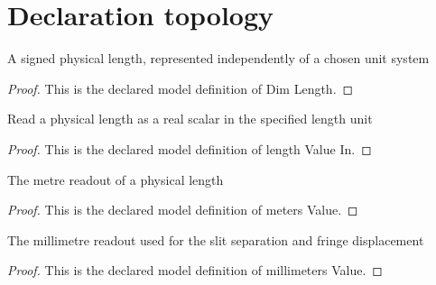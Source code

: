 \section{Declaration topology}
\begin{definition}
  \label{def:physics:phyx-mini-0046:phyxminiproblems-problemphyxmini0046-dimlength}
  A signed physical length, represented independently of a chosen unit system
\end{definition}
\begin{proof}
  This is the declared model definition of Dim Length.
\end{proof}
\begin{definition}
  \label{def:physics:phyx-mini-0046:phyxminiproblems-problemphyxmini0046-lengthvaluein}
  Read a physical length as a real scalar in the specified length unit
\end{definition}
\begin{proof}
  This is the declared model definition of length Value In.
\end{proof}
\begin{definition}
  \label{def:physics:phyx-mini-0046:phyxminiproblems-problemphyxmini0046-metersvalue}
  The metre readout of a physical length
\end{definition}
\begin{proof}
  This is the declared model definition of meters Value.
\end{proof}
\begin{definition}
  \label{def:physics:phyx-mini-0046:phyxminiproblems-problemphyxmini0046-millimetersvalue}
  The millimetre readout used for the slit separation and fringe displacement
\end{definition}
\begin{proof}
  This is the declared model definition of millimeters Value.
\end{proof}
